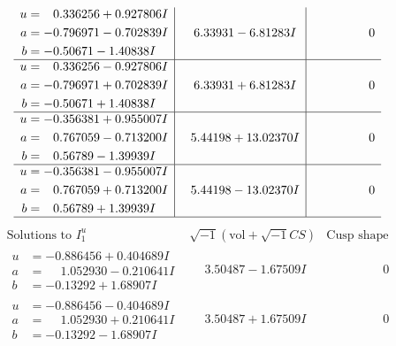 \documentclass[1p]{elsarticle_modified}
\theoremstyle{definition}
\newcommand{\I}{\sqrt{-1}}
\begin{document}
$$\begin{array}{c|c|c}
\begin{aligned}
u &= \phantom{-}0.336256 + 0.927806 I \\
a &= -0.796971 - 0.702839 I \\
b &= -0.50671 - 1.40838 I\end{aligned}
 & \phantom{-}6.33931 - 6.81283 I & \phantom{-0.000000 } 0 \\ \hline\begin{aligned}
u &= \phantom{-}0.336256 - 0.927806 I \\
a &= -0.796971 + 0.702839 I \\
b &= -0.50671 + 1.40838 I\end{aligned}
 & \phantom{-}6.33931 + 6.81283 I & \phantom{-0.000000 } 0 \\ \hline\begin{aligned}
u &= -0.356381 + 0.955007 I \\
a &= \phantom{-}0.767059 - 0.713200 I \\
b &= \phantom{-}0.56789 - 1.39939 I\end{aligned}
 & \phantom{-}5.44198 + 13.02370 I & \phantom{-0.000000 } 0 \\ \hline\begin{aligned}
u &= -0.356381 - 0.955007 I \\
a &= \phantom{-}0.767059 + 0.713200 I \\
b &= \phantom{-}0.56789 + 1.39939 I\end{aligned}
 & \phantom{-}5.44198 - 13.02370 I & \phantom{-0.000000 } 0\\
 \hline 
 \end{array}$$\newpage$$\begin{array}{c|c|c}  
\text{Solutions to }I^u_{1}& \I (\text{vol} + \sqrt{-1}CS) & \text{Cusp shape}\\
 \hline 
\begin{aligned}
u &= -0.886456 + 0.404689 I \\
a &= \phantom{-}1.052930 - 0.210641 I \\
b &= -0.13292 + 1.68907 I\end{aligned}
 & \phantom{-}3.50487 - 1.67509 I & \phantom{-0.000000 } 0 \\ \hline\begin{aligned}
u &= -0.886456 - 0.404689 I \\
a &= \phantom{-}1.052930 + 0.210641 I \\
b &= -0.13292 - 1.68907 I\end{aligned}
 & \phantom{-}3.50487 + 1.67509 I & \phantom{-0.000000 } 0 \\ \hline\begin{aligned}

\end{aligned}
\end{array}$$
\end{document}
